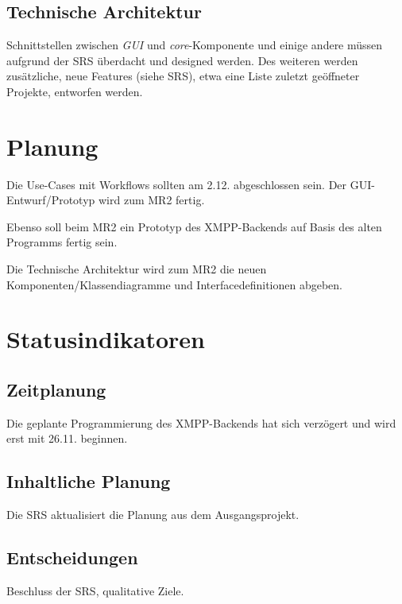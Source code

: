 \subsection{Technische Architektur}
Schnittstellen zwischen \emph{GUI} und \emph{core}-Komponente und einige andere müssen 
aufgrund der SRS überdacht und designed werden. Des weiteren werden zusätzliche,
neue Features (siehe SRS), etwa eine Liste zuletzt geöffneter Projekte, 
entworfen werden.
\section{Planung}
Die Use-Cases mit Workflows sollten am 2.12. abgeschlossen sein. Der 
GUI-Entwurf/Prototyp wird zum MR2 fertig.

Ebenso soll beim MR2 ein Prototyp des XMPP-Backends auf Basis des alten 
Programms fertig sein.

Die Technische Architektur wird zum MR2 die neuen Komponenten/Klassendiagramme 
und Interfacedefinitionen abgeben.

\section{Statusindikatoren}

\subsection{Zeitplanung}
Die geplante Programmierung des XMPP-Backends hat sich verzögert und wird erst 
mit 26.11. beginnen.

\subsection{Inhaltliche Planung}
Die SRS aktualisiert die Planung aus dem Ausgangsprojekt.

\subsection{Entscheidungen}
Beschluss der SRS, qualitative Ziele.

















